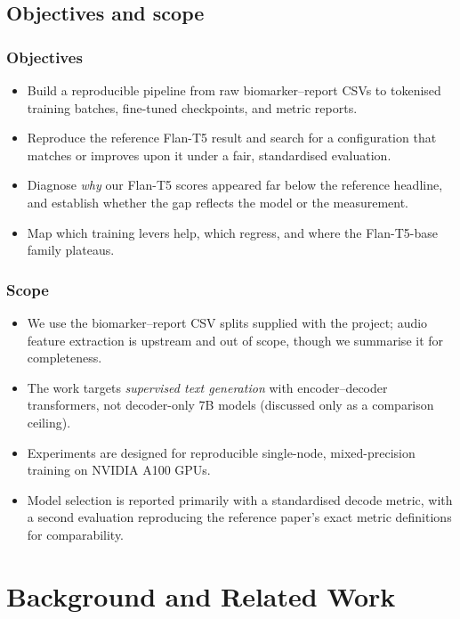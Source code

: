 \documentclass[11pt,twocolumn]{article}
\begin{document}
\subsection{Objectives and scope}
\subsubsection{Objectives}
\begin{itemize}[leftmargin=1.1em,itemsep=0.12em,topsep=0.2em]
  \item Build a reproducible pipeline from raw biomarker--report CSVs to tokenised training
        batches, fine-tuned checkpoints, and metric reports.
  \item Reproduce the reference Flan-T5 result and search for a configuration that matches or
        improves upon it under a fair, standardised evaluation.
  \item Diagnose \emph{why} our Flan-T5 scores appeared far below the reference headline, and
        establish whether the gap reflects the model or the measurement.
  \item Map which training levers help, which regress, and where the Flan-T5-base family
        plateaus.
\end{itemize}

\subsubsection{Scope}
\begin{itemize}[leftmargin=1.1em,itemsep=0.12em,topsep=0.2em]
  \item We use the biomarker--report CSV splits supplied with the project; audio feature
        extraction is upstream and out of scope, though we summarise it for completeness.
  \item The work targets \emph{supervised text generation} with encoder--decoder transformers,
        not decoder-only 7B models (discussed only as a comparison ceiling).
  \item Experiments are designed for reproducible single-node, mixed-precision training on
        NVIDIA A100 GPUs.
  \item Model selection is reported primarily with a standardised decode metric, with a second
        evaluation reproducing the reference paper's exact metric definitions for comparability.
\end{itemize}

\section{Background and Related Work}
\end{document}
